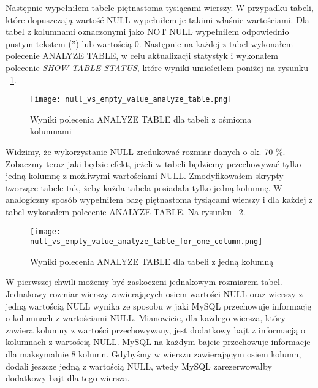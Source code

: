 Następnie wypełniłem tabele piętnastoma tysiącami wierszy. W przypadku tabeli, które dopuszczają wartość NULL wypełniłem je takimi właśnie wartościami. Dla tabel z kolumnami oznaczonymi jako NOT NULL wypełniłem odpowiednio pustym tekstem ('') lub wartością 0.
Następnie na każdej z tabel wykonałem polecenie ANALYZE TABLE, w celu aktualizacji statystyk i wykonałem polecenie \textit{SHOW TABLE STATUS}, które wyniki umieściłem poniżej na rysunku ~\ref{fig:null_vs_empty_value_analyze_table}.

\begin{figure}
	\caption{Wyniki polecenia ANALYZE TABLE dla tabeli z ośmioma kolumnami}
	\centering
	\texttt{[image: null\_vs\_empty\_value\_analyze\_table.png]}
	\label{fig:null_vs_empty_value_analyze_table}
\end{figure}

Widzimy, że wykorzystanie NULL zredukować rozmiar danych o ok. 70 \%. Zobaczmy teraz jaki będzie efekt, jeżeli w tabeli będziemy przechowywać tylko jedną kolumnę z możliwymi wartościami NULL. Zmodyfikowałem skrypty tworzące tabele tak, żeby każda tabela posiadała tylko jedną kolumnę. W analogiczny sposób wypełniłem bazę piętnastoma tysiącami wierszy i dla każdej z tabel wykonałem polecenie ANALYZE TABLE. Na rysunku ~\ref{fig:null_vs_empty_value_analyze_table_for_one_column}.

\begin{figure}
	\caption{Wyniki polecenia ANALYZE TABLE dla tabeli z jedną kolumną}
	\centering
	\texttt{[image: null\_vs\_empty\_value\_analyze\_table\_for\_one\_column.png]}
	\label{fig:null_vs_empty_value_analyze_table_for_one_column}
\end{figure}

W pierwszej chwili możemy być zaskoczeni jednakowym rozmiarem tabel. Jednakowy rozmiar wierszy zawierających osiem wartości NULL oraz wierszy z jedną wartością NULL wynika ze sposobu w jaki MySQL przechowuje informację o kolumnach z wartościami NULL. Mianowicie, dla każdego wiersza, który zawiera kolumny z wartości przechowywany, jest dodatkowy bajt z informacją o kolumnach z wartością NULL. MySQL na każdym bajcie przechowuje informacje dla maksymalnie 8 kolumn. Gdybyśmy w wierszu zawierającym osiem kolumn, dodali jeszcze jedną z wartością NULL, wtedy MySQL zarezerwowałby dodatkowy bajt dla tego wiersza.


